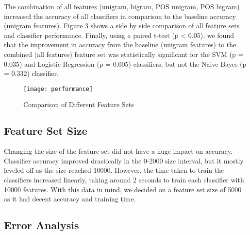 \documentclass[twocolumn]{article}
\begin{document}
The combination of all features (unigram, bigram, POS unigram, POS bigram) increased the accuracy of all classifiers in comparison to the baseline accuracy (unigram features). Figure 3 shows a side by side comparison of all feature sets and classifier performance. Finally, using a paired t-test (p < 0.05), we found that the improvement in accuracy from the baseline (unigram features) to the combined (all features) feature set was statistically significant for the SVM (p = 0.035) and Logistic Regression (p = 0.005) classifiers, but not the Naive Bayes (p = 0.332) classifier.

\begin{figure}
    \centering
    \texttt{[image: performance]}
    \caption{Comparison of Different Feature Sets}
\end{figure}

\subsection{Feature Set Size}

Changing the size of the feature set did not have a huge impact on accuracy. Classifier accuracy improved drastically in the 0-2000 size interval, but it mostly leveled off as the size reached 10000. However, the time taken to train the classifiers increased linearly, taking around 2 seconds to train each classifier with 10000 features. With this data in mind, we decided on a feature set size of 5000 as it had decent accuracy and training time.

\subsection{Error Analysis}
\end{document}

